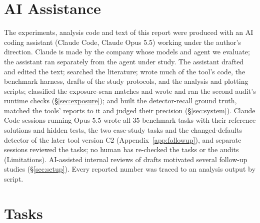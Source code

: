 \documentclass[11pt]{article}
\begin{document}
\section*{AI Assistance}

The experiments, analysis code and text of this report were produced with an AI coding assistant (Claude Code, Claude Opus 5.5) working under the author's direction.
Claude is made by the company whose models and agent we evaluate; the assistant ran separately from the agent under study.
The assistant drafted and edited the text; searched the literature; wrote much of the tool's code, the benchmark harness, drafts of the study protocols, and the analysis and plotting scripts; classified the exposure-scan matches and wrote and ran the second audit's runtime checks (\S\ref{sec:exposure}); and built the detector-recall ground truth, matched the tools' reports to it and judged their precision (\S\ref{sec:system}).
Claude Code sessions running Opus 5.5 wrote all 35 benchmark tasks with their reference solutions and hidden tests, the two case-study tasks and the changed-defaults detector of the later tool version C2 (Appendix~\ref{app:followup}), and separate sessions reviewed the tasks; no human has re-checked the tasks or the audits (Limitations).
AI-assisted internal reviews of drafts motivated several follow-up studies (\S\ref{sec:setup}).
Every reported number was traced to an analysis output by script.



\appendix

\section{Tasks}
\label{app:tasks}
\end{document}
